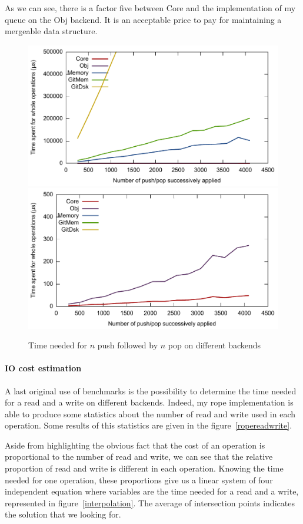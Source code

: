 \documentclass{article}
\begin{document}
As we can see, there is a factor five between Core and the implementation of my queue on the Obj backend.
It is an acceptable price to pay for maintaining a mergeable data structure.

\begin{figure}[hbt]
\centering
\includegraphics[scale=0.6]{images/queue_backend.pdf}
\includegraphics[scale=0.6]{images/queue_zoom.pdf}
\caption{Time needed for $n$ push followed by $n$ pop on different backends}
\label{queuebackend}
\end{figure}

\paragraph{IO cost estimation}
A last original use of benchmarks is the possibility to determine the time needed for a read and a write on different backends.
Indeed, my rope implementation is able to produce some statistics about the number of read and write used in each operation.
Some results of this statistics are given in the figure~\ref{ropereadwrite}.

Aside from highlighting the obvious fact that the cost of an operation is proportional to the number of read and write, we can see that the relative proportion of read and write is different in each operation.
Knowing the time needed for one operation, these proportions give us a linear system of four independent equation where variables are the time needed for a read and a write, represented in figure~\ref{interpolation}.
The average of intersection points indicates the solution that we looking for.
\end{document}
